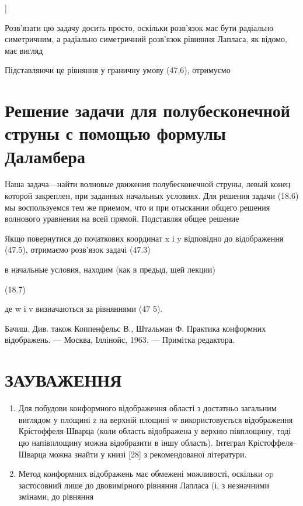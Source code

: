 \documentclass[
  ukrainian,
]{article}
\begin{document}
{]}

Розв'язати цю задачу досить просто, оскільки розв'язок має бути
радіально симетричним, а радіально симетричний розв'язок рівняння
Лапласа, як відомо, має вигляд

Підставляючи це рівняння у граничну умову (47,6), отримуємо

\section{Решение задачи для полубесконечной струны с помощью формулы
Даламбера}\label{ux440ux435ux448ux435ux43dux438ux435-ux437ux430ux434ux430ux447ux438-ux434ux43bux44f-ux43fux43eux43bux443ux431ux435ux441ux43aux43eux43dux435ux447ux43dux43eux439-ux441ux442ux440ux443ux43dux44b-ux441-ux43fux43eux43cux43eux449ux44cux44e-ux444ux43eux440ux43cux443ux43bux44b-ux434ux430ux43bux430ux43cux431ux435ux440ux430}

Наша задача---найти волновые движения полубесконечной струны, левый
конец которой закреплен, при заданных начальных условиях. Для решения
задачи (18.6) мы воспользуемся тем же приемом, что и при отыскании
общего решения волнового уравнения на всей прямой. Подставляя общее
решение

Якщо повернутися до початкових координат x і y відповідно до
відображення (47.5), отримаємо розв'язок задачі (47.3)

в начальные условия, находим (как в предыд, щей лекции)

(18.7)

де w і v визначаються за рівняннями (47 5).

Бачиш. Див. також Коппенфельс В., Штальман Ф. Практика конформних
відображень. --- Москва, Іллінойс, 1963. --- Примітка редактора.

\section{ЗАУВАЖЕННЯ}\label{ux437ux430ux443ux432ux430ux436ux435ux43dux43dux44f-7}

\begin{enumerate}
\def\labelenumi{\arabic{enumi}.}
\item
  Для побудови конформного відображення області з достатньо загальним
  виглядом у площині z на верхній площині w використовується
  відображення Крістоффеля-Шварца (коли область відображена у верхню
  півплощину, тоді цю напівплощину можна відобразити в іншу область).
  Інтеграл Крістоффеля--Шварца можна знайти у книзі {[}28{]} з
  рекомендованої літератури.
\item
  Метод конформних відображень має обмежені можливості, оскільки op
  застосовний лише до двовимірного рівняння Лапласа (і, з незначними
  змінами, до рівняння
\end{enumerate}
\end{document}
